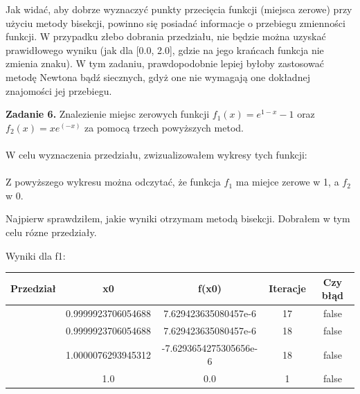 \documentclass[15pt, a4paper]{article}
\begin{document}
\noindent Jak widać, aby dobrze wyznaczyć punkty przecięcia funkcji (miejsca zerowe) przy użyciu metody bisekcji, powinno się posiadać informacje o przebiegu zmienności funkcji. W przypadku złebo dobrania przedziału, nie będzie można uzyskać prawidłowego wyniku (jak dla [0.0, 2.0], gdzie na jego krańcach funkcja nie zmienia znaku). W tym zadaniu, prawdopodobnie lepiej byłoby zastosować metodę Newtona bądź siecznych, gdyż one nie wymagają one dokładnej znajomości jej przebiegu.



\vspace{0.5cm}

\noindent\hrulefill

\vspace{0.5cm}


\noindent\textbf{Zadanie 6.} Znalezienie miejsc zerowych funkcji \( f_1(x) = e^{1-x} - 1 \) oraz \(f_2(x) = xe^(-x)\) za pomocą trzech powyższych metod.\\\\
\noindent W celu wyznaczenia przedziału, zwizualizowałem wykresy tych funkcji: \\\\

\noindent Z powyższego wykresu można odczytać, że funkcja \(f_1 \) ma miejce zerowe w 1, a \(f_2\) w 0. 

\noindent Najpierw sprawdziłem, jakie wyniki otrzymam metodą bisekcji. Dobrałem w tym celu rózne przedziały.

\noindent Wyniki dla f1:
\begin{table}[ht]
\begin{adjustbox}{max width=\textwidth}
\begin{tabular}{|c|c|c|c|c|}
    \hline
    \textbf{Przedział} & \textbf{x0} & \textbf{f(x0)} & \textbf{Iteracje} & \textbf{Czy błąd} \\
    \hline
    [0.0, 1.0] & 0.9999923706054688 & 7.629423635080457e-6 & 17 & false \\
    \hline
    [-1.0, 1.0] & 0.9999923706054688 & 7.629423635080457e-6 & 18 & false \\
    \hline
    [-3.0, 3.0] & 1.0000076293945312 & -7.6293654275305656e-6 & 18 & false \\
    \hline
    [-0.0, 2.0] & 1.0 & 0.0 & 1 & false \\
    \hline
\end{tabular}
\end{adjustbox}
\end{table}
\end{document}
